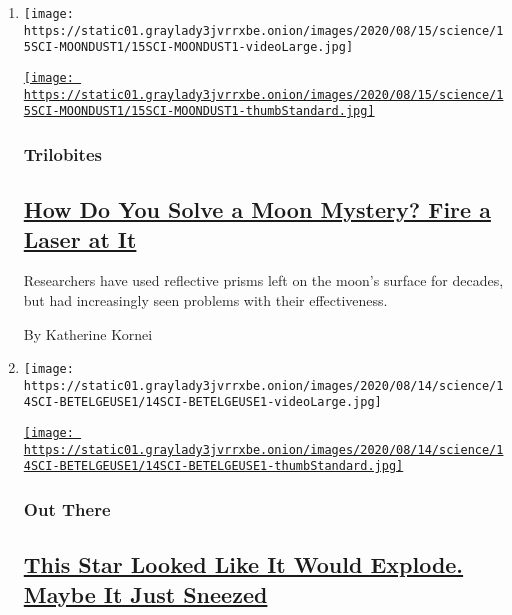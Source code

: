 \begin{enumerate}
\def\labelenumi{\arabic{enumi}.}
\item
  \texttt{[image: https://static01.graylady3jvrrxbe.onion/images/2020/08/15/science/15SCI-MOONDUST1/15SCI-MOONDUST1-videoLarge.jpg]}

  \href{/2020/08/15/science/moon-lasers-dust.html}{\texttt{[image: https://static01.graylady3jvrrxbe.onion/images/2020/08/15/science/15SCI-MOONDUST1/15SCI-MOONDUST1-thumbStandard.jpg]}}

  \hypertarget{trilobites}{%
  \subsubsection{Trilobites}\label{trilobites}}

  \hypertarget{how-do-you-solve-a-moon-mystery-fire-a-laser-at-it}{%
  \subsection{\texorpdfstring{\href{/2020/08/15/science/moon-lasers-dust.html}{How
  Do You Solve a Moon Mystery? Fire a Laser at
  It}}{How Do You Solve a Moon Mystery? Fire a Laser at It}}\label{how-do-you-solve-a-moon-mystery-fire-a-laser-at-it}}

  Researchers have used reflective prisms left on the moon's surface for
  decades, but had increasingly seen problems with their effectiveness.

  By Katherine Kornei
\item
  \texttt{[image: https://static01.graylady3jvrrxbe.onion/images/2020/08/14/science/14SCI-BETELGEUSE1/14SCI-BETELGEUSE1-videoLarge.jpg]}

  \href{/2020/08/14/science/betelgeuse-star-supernova.html}{\texttt{[image: https://static01.graylady3jvrrxbe.onion/images/2020/08/14/science/14SCI-BETELGEUSE1/14SCI-BETELGEUSE1-thumbStandard.jpg]}}

  \hypertarget{out-there}{%
  \subsubsection{Out There}\label{out-there}}

  \hypertarget{this-star-looked-like-it-would-explode-maybe-it-just-sneezed}{%
  \subsection{\texorpdfstring{\href{/2020/08/14/science/betelgeuse-star-supernova.html}{This
  Star Looked Like It Would Explode. Maybe It Just
  Sneezed}}{This Star Looked Like It Would Explode. Maybe It Just Sneezed}}\label{this-star-looked-like-it-would-explode-maybe-it-just-sneezed}}


\end{enumerate}
